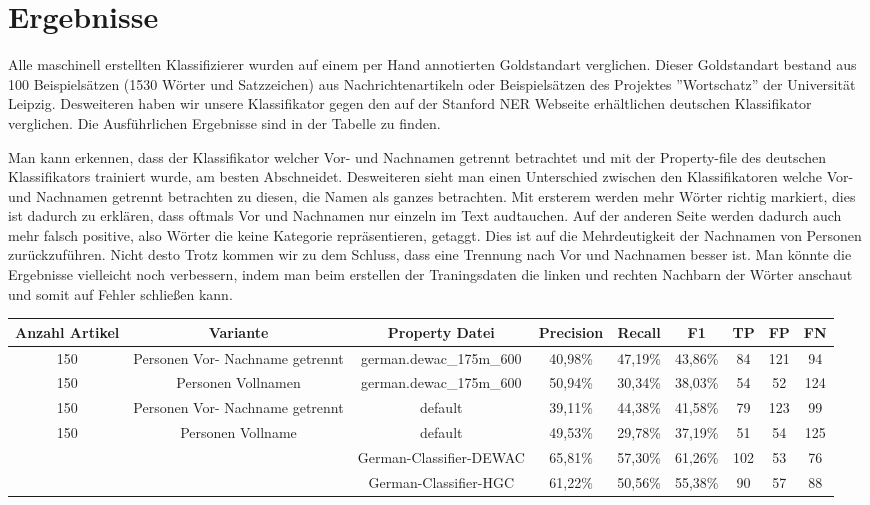 \documentclass[a4paper]{article}
\begin{document}
\section{Ergebnisse}
	Alle maschinell erstellten Klassifizierer wurden auf einem per Hand annotierten Goldstandart verglichen. 
	Dieser Goldstandart bestand aus 100 Beispielsätzen (1530 Wörter und Satzzeichen) aus Nachrichtenartikeln oder Beispielsätzen des Projektes ''Wortschatz'' der Universität Leipzig. 
	Desweiteren haben wir unsere Klassifikator gegen den auf der Stanford NER Webseite erhältlichen deutschen Klassifikator  verglichen. Die Ausführlichen Ergebnisse sind in der Tabelle  zu finden.
	
	Man kann erkennen, dass der Klassifikator welcher Vor- und Nachnamen getrennt betrachtet und mit der Property-file des deutschen Klassifikators trainiert wurde, am besten Abschneidet. 
	Desweiteren sieht man einen Unterschied zwischen den Klassifikatoren welche Vor- und Nachnamen getrennt betrachten zu diesen, die Namen als ganzes betrachten. 
	Mit ersterem werden mehr Wörter richtig markiert, dies ist dadurch zu erklären, dass oftmals Vor und Nachnamen nur einzeln im Text audtauchen. 
	Auf der anderen Seite werden dadurch auch mehr falsch positive, also Wörter die keine Kategorie repräsentieren, getaggt. 
	Dies ist auf die Mehrdeutigkeit der Nachnamen von Personen zurückzuführen. 
	Nicht desto Trotz kommen wir zu dem Schluss, dass eine Trennung nach Vor und Nachnamen besser ist. 
	Man könnte die Ergebnisse vielleicht noch verbessern, indem man beim erstellen der Traningsdaten die linken und rechten Nachbarn der Wörter anschaut und somit auf Fehler schließen kann. 
	
	
	



\begin{sidewaystable}
\label{Tabelle Ergebnisse}
\caption{Ergebnistabelle}
\begin{longtable}{|c|c|c|c|c|c|c|c|c|}
\hline 
Anzahl Artikel & Variante & Property Datei & Precision & Recall & F1 & TP & FP & FN \\ 
\hline 
150 & Personen Vor- Nachname getrennt & german.dewac\_175m\_600 & 40,98\% & 47,19\% & 43,86\% & 84 & 121 & 94 \\ 
\hline 
150 & Personen Vollnamen & german.dewac\_175m\_600 & 50,94\% & 30,34\% & 38,03\% & 54 & 52 & 124 \\ 
\hline 
150 & Personen Vor- Nachname getrennt & default & 39,11\% & 44,38\% & 41,58\% &  79 & 123 & 99 \\ 
\hline 
150 & Personen Vollname & default & 49,53\% & 29,78\% & 37,19\% & 51 & 54 & 125 \\ 
\hline 
  &  & German-Classifier-DEWAC & 65,81\% & 57,30\% & 61,26\% & 102 & 53 & 76 \\ 
\hline 
  &  & German-Classifier-HGC & 61,22\% & 50,56\% & 55,38\% & 90 & 57 & 88 \\ 
\hline
\end{longtable} 
\end{sidewaystable}
\end{document}

